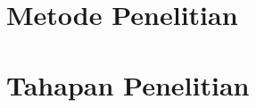 


\section{Metode Penelitian}
\label{sec:metode-penelitian}


\section{Tahapan Penelitian}
\label{sec:tahapan-penelitian}

